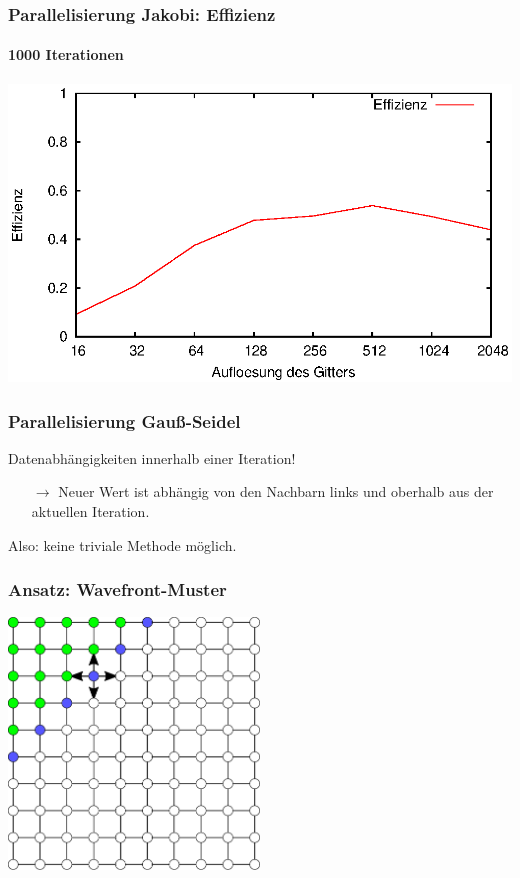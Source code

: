 \documentclass{beamer}
\begin{document}
\begin{frame}
    \frametitle{Parallelisierung Jakobi: Effizienz}
    \framesubtitle{1000 Iterationen}
    \includegraphics[width=\textwidth]{plots/effizienzjakobi}
\end{frame}

\begin{frame}
    \frametitle{Parallelisierung Gauß-Seidel}
    Datenabhängigkeiten innerhalb einer Iteration!
    \begin{itemize}
        \item[$\rightarrow$] Neuer Wert ist abhängig von den Nachbarn links und oberhalb aus der aktuellen Iteration.
    \end{itemize}
    Also: keine triviale Methode möglich.
\end{frame}

\begin{frame}
    \frametitle{Ansatz: Wavefront-Muster}
    \begin{center}
        \includegraphics[width=0.5\textwidth]{wavefront-datadependencies}
    \end{center}
\end{frame}
\end{document}
